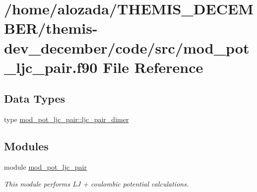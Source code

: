 \hypertarget{mod__pot__ljc__pair_8f90}{}\section{/home/alozada/\+T\+H\+E\+M\+I\+S\+\_\+\+D\+E\+C\+E\+M\+B\+E\+R/themis-\/dev\+\_\+december/code/src/mod\+\_\+pot\+\_\+ljc\+\_\+pair.f90 File Reference}
\label{mod__pot__ljc__pair_8f90}
\subsection*{Data Types}
\begin{DoxyCompactItemize}
\item 
type \hyperlink{structmod__pot__ljc__pair_1_1ljc__pair__dimer}{mod\+\_\+pot\+\_\+ljc\+\_\+pair\+::ljc\+\_\+pair\+\_\+dimer}
\end{DoxyCompactItemize}
\subsection*{Modules}
\begin{DoxyCompactItemize}
\item 
module \hyperlink{namespacemod__pot__ljc__pair}{mod\+\_\+pot\+\_\+ljc\+\_\+pair}
\begin{DoxyCompactList}\small\item\em This module performs LJ + coulombic potential calculations. \end{DoxyCompactList}\end{DoxyCompactItemize}
